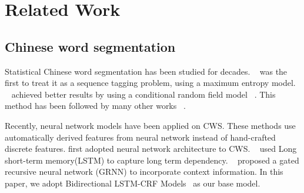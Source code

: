 \section{Related Work}

\subsection{Chinese word segmentation}

Statistical Chinese word segmentation has been studied for decades. ~ was the first to treat it as a sequence tagging problem, using a maximum entropy model. ~ achieved better results by using a conditional random field model ~\cite{lafferty2001conditional}. This method has been followed by many other works ~\cite{DBLP:conf/paclic/ZhaoHLL06,Sun:2012tl}.

Recently, neural network models have been applied on CWS. These methods use automatically derived features from neural network instead of hand-crafted discrete features.  first adopted neural network architecture to CWS. ~ used Long short-term memory(LSTM) to capture long term dependency. ~ proposed a gated recursive neural network (GRNN) to incorporate context information. In this paper, we adopt Bidirectional LSTM-CRF Models~\cite{DBLP:journals/corr/HuangXY15} as our base model.

